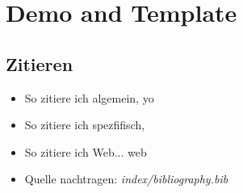\chapter{Demo and Template}
\section{Zitieren}
\begin{itemize}
	\item{So zitiere ich algemein, \cite{lin1973} yo}
	\item{So zitiere ich spezfifisch, \cite[S. 15]{lin1973}}
	\item{So zitiere ich Web... web \cite{learnHaskell}}
	\item{Quelle nachtragen: \textit{index/bibliography.bib}}
\end{itemize}